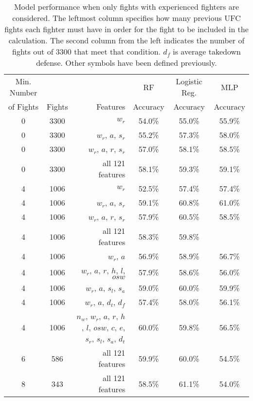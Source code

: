 \begin{center}
\begin{table}[h]
\begin{tabular}{ccr|ccc}
\toprule
Min. Number &        &         & RF        & Logistic Reg. & MLP      \\
of Fights & Fights & Features & Accuracy & Accuracy      & Accuracy\\
\hline
0  & 3300 & $w_r$ & 54.0\% & 55.0\% & 55.9\%  \\
0  & 3300 & $w_r$, $a$, $s_r$ & 55.2\% & 57.3\% & 58.0\%  \\
0  & 3300 & $w_r$, $a$, $r$, $s_r$ & 57.0\% & 58.1\% & 58.5\%  \\
0  & 3300 & all 121 features & 58.1\% & 59.3\% & 59.1\% \\
4  & 1006 & $w_r$ & 52.5\% & 57.4\% & 57.4\%  \\
4  & 1006 & $w_r$, $a$, $s_r$ & 59.1\% & 60.8\% & 61.0\%  \\
4  & 1006 & $w_r$, $a$, $r$, $s_r$ & 57.9\% & 60.5\% & 58.5\% \\
4  & 1006 & all 121 features & 58.3\% & 59.8\% &   \\
4  & 1006 & $w_r$, $a$ & 56.9\% & 58.9\% & 56.7\%  \\
4  & 1006 & $w_r$, $a$, $r$, $h$, $l$, $osw$ & 57.9\% & 58.6\% & 56.0\%\\
4  & 1006 & $w_r$, $a$, $s_l$, $s_a$ & 59.0\% & 60.0\% & 59.9\%  \\
4  & 1006 & $w_r$, $a$, $d_t$, $d_f$ & 57.4\% & 58.0\% & 56.1\%  \\
4  & 1006 & $n_w$, $w_r$, $a$, $r$, $h$, $l$, $osw$, $c$, $e$, $s_r$, $s_l$, $s_a$, $d_t$ & 60.0\% & 59.8\% & 56.5\%  \\
6  &  586 & all 121 features & 59.9\% & 60.0\% & 54.5\% \\
8  &  343 & all 121 features & 58.5\% & 61.1\% & 54.0\% \\
\bottomrule
\end{tabular}
\caption{Model performance when only fights with experienced
fighters are considered. The leftmost column specifies how
many previous UFC fights each fighter must have in order
for the fight to be included in the calculation. The second
column from the left indicates the number of fights out of 3300 that
meet that condition. $d_f$ is average takedown defense. Other symbols
have been defined previously.}
\label{other_features_with_min}
\end{table}
\end{center}


